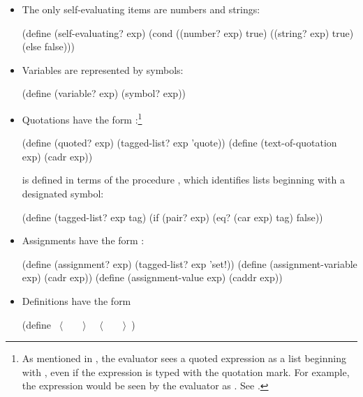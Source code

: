 \begin{itemize}
\item
The only self-evaluating items are numbers and strings:

\begin{codeBlock}
(define (self-evaluating? exp)
  (cond ((number? exp) true)
        ((string? exp) true)
        (else false)))
\end{codeBlock}

\item
Variables are represented by symbols:

\begin{codeBlock}
(define (variable? exp) (symbol? exp))
\end{codeBlock}

\item
Quotations have the form :\footnote{As
mentioned in , the evaluator sees a quoted expression as a
list beginning with , even if the expression is typed with the
quotation mark.  For example, the expression  would be seen by the
evaluator as .  See .}

\begin{codeBlock}
(define (quoted? exp) (tagged-list? exp 'quote))
(define (text-of-quotation exp) (cadr exp))
\end{codeBlock}

 is defined in terms of the procedure , which
identifies lists beginning with a designated symbol:

\begin{codeBlock}
(define (tagged-list? exp tag)
  (if (pair? exp)
      (eq? (car exp) tag)
      false))
\end{codeBlock}

\item
Assignments have the form :

\begin{codeBlock}
(define (assignment? exp) (tagged-list? exp 'set!))
(define (assignment-variable exp) (cadr exp))
(define (assignment-value exp) (caddr exp))
\end{codeBlock}

\item
Definitions have the form

\begin{codeBlock}
(define ~\(\langle \)~~~~\(\rangle \)~ ~\(\langle \)~~~~\(\rangle \)~)
\end{codeBlock}


\end{itemize}

